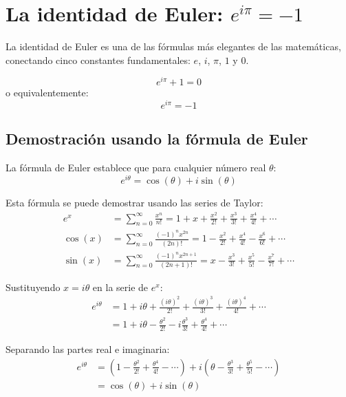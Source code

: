 \section{La identidad de Euler: $e^{i\pi} = -1$}\label{sec:geom}

La identidad de Euler es una de las fórmulas más elegantes de las matemáticas, conectando cinco constantes fundamentales: $e$, $i$, $\pi$, $1$ y $0$.

\begin{theorem}
$$e^{i\pi} + 1 = 0$$
o equivalentemente:
$$e^{i\pi} = -1$$
\end{theorem}

\subsection{Demostración usando la fórmula de Euler}

La fórmula de Euler establece que para cualquier número real $\theta$:
\begin{equation}\label{eq:euler_formula}
e^{i\theta} = \cos(\theta) + i\sin(\theta)
\end{equation}

Esta fórmula se puede demostrar usando las series de Taylor:
\begin{align}
e^x &= \sum_{n=0}^{\infty} \frac{x^n}{n!} = 1 + x + \frac{x^2}{2!} + \frac{x^3}{3!} + \frac{x^4}{4!} + \cdots \\
\cos(x) &= \sum_{n=0}^{\infty} \frac{(-1)^n x^{2n}}{(2n)!} = 1 - \frac{x^2}{2!} + \frac{x^4}{4!} - \frac{x^6}{6!} + \cdots \\
\sin(x) &= \sum_{n=0}^{\infty} \frac{(-1)^n x^{2n+1}}{(2n+1)!} = x - \frac{x^3}{3!} + \frac{x^5}{5!} - \frac{x^7}{7!} + \cdots
\end{align}

Sustituyendo $x = i\theta$ en la serie de $e^x$:
\begin{align}
e^{i\theta} &= 1 + i\theta + \frac{(i\theta)^2}{2!} + \frac{(i\theta)^3}{3!} + \frac{(i\theta)^4}{4!} + \cdots \\
&= 1 + i\theta - \frac{\theta^2}{2!} - i\frac{\theta^3}{3!} + \frac{\theta^4}{4!} + \cdots
\end{align}

Separando las partes real e imaginaria:
\begin{align}
e^{i\theta} &= \left(1 - \frac{\theta^2}{2!} + \frac{\theta^4}{4!} - \cdots\right) + i\left(\theta - \frac{\theta^3}{3!} + \frac{\theta^5}{5!} - \cdots\right) \\
&= \cos(\theta) + i\sin(\theta)
\end{align}

